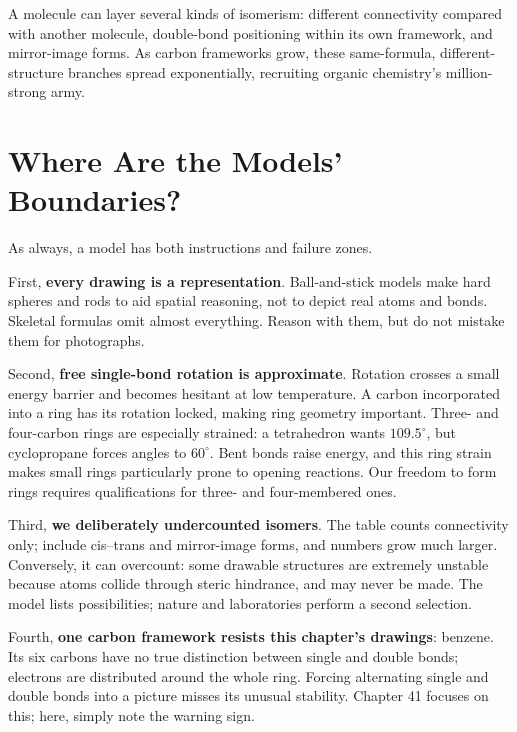 A molecule can layer several kinds of isomerism: different connectivity compared with another molecule, double-bond positioning within its own framework, and mirror-image forms. As carbon frameworks grow, these same-formula, different-structure branches spread exponentially, recruiting organic chemistry's million-strong army.

\section{Where Are the Models' Boundaries?}

As always, a model has both instructions and failure zones.

First, \textbf{every drawing is a representation}. Ball-and-stick models make hard spheres and rods to aid spatial reasoning, not to depict real atoms and bonds. Skeletal formulas omit almost everything. Reason with them, but do not mistake them for photographs.

Second, \textbf{free single-bond rotation is approximate}. Rotation crosses a small energy barrier and becomes hesitant at low temperature. A carbon incorporated into a ring has its rotation locked, making ring geometry important. Three- and four-carbon rings are especially strained: a tetrahedron wants $109.5^{\circ}$, but cyclopropane forces angles to $60^{\circ}$. Bent bonds raise energy, and this ring strain makes small rings particularly prone to opening reactions. Our freedom to form rings requires qualifications for three- and four-membered ones.

Third, \textbf{we deliberately undercounted isomers}. The table counts connectivity only; include cis--trans and mirror-image forms, and numbers grow much larger. Conversely, it can overcount: some drawable structures are extremely unstable because atoms collide through steric hindrance, and may never be made. The model lists possibilities; nature and laboratories perform a second selection.

Fourth, \textbf{one carbon framework resists this chapter's drawings}: benzene. Its six carbons have no true distinction between single and double bonds; electrons are distributed around the whole ring. Forcing alternating single and double bonds into a picture misses its unusual stability. Chapter 41 focuses on this; here, simply note the warning sign.

